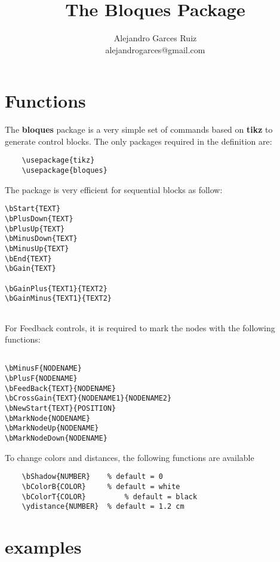 \documentclass[a4paper,onecolumn]{IEEETran}
\title{The Bloques Package}
\author{Alejandro Garces Ruiz \\ alejandrogarces@gmail.com}
\begin{document}
\maketitle

\section{Functions}


The \textbf{bloques} package is a very simple set of commands based on \textbf{tikz} to generate control blocks.  The only packages required in the definition are:

\begin{verbatim}
	\usepackage{tikz}
	\usepackage{bloques}
\end{verbatim}

The package is very efficient for sequential blocks as follow:

\begin{verbatim}
\bStart{TEXT}
\bPlusDown{TEXT}
\bPlusUp{TEXT}
\bMinusDown{TEXT}
\bMinusUp{TEXT}
\bEnd{TEXT}
\bGain{TEXT}

\bGainPlus{TEXT1}{TEXT2}
\bGainMinus{TEXT1}{TEXT2}


\end{verbatim}

For Feedback controls, it is required to mark the nodes with the following functions:

\begin{verbatim}

\bMinusF{NODENAME}
\bPlusF{NODENAME}
\bFeedBack{TEXT}{NODENAME}
\bCrossGain{TEXT}{NODENAME1}{NODENAME2}
\bNewStart{TEXT}{POSITION}
\bMarkNode{NODENAME}
\bMarkNodeUp{NODENAME}
\bMarkNodeDown{NODENAME}
\end{verbatim}


To change colors and distances, the following functions are available

\begin{verbatim}
	\bShadow{NUMBER}  	% default = 0
	\bColorB{COLOR}   	% default = white 
	\bColorT{COLOR}			% default = black
	\ydistance{NUMBER}	% default = 1.2 cm
\end{verbatim}

\newpage

\section{examples}
\end{document}
